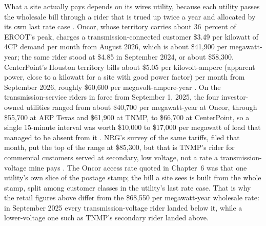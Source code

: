 What a site actually pays depends on its wires utility, because each utility passes the wholesale bill through a rider that is trued up twice a year and allocated by its own last rate case \autocite{puct25193}. %
Oncor, whose territory carries about 36~percent of ERCOT's peak, charges a transmission-connected customer \$3.49 per kilowatt of 4CP demand per month from August 2026, which is about \$41,900 per megawatt-year; the same rider stood at \$4.85 in September 2024, or about \$58,300. %
CenterPoint's Houston territory bills about \$5.05 per kilovolt-ampere (apparent power, close to a kilowatt for a site with good power factor) per month from September 2026, roughly \$60,600 per megavolt-ampere-year \autocite{centerpoint2026retailtariff}. %
On the transmission-service riders in force from September 1, 2025, the four investor-owned utilities ranged from about \$40,700 per megawatt-year at Oncor, through \$55,700 at AEP Texas and \$61,900 at TNMP, to \$66,700 at CenterPoint, so a single 15-minute interval was worth \$10,000 to \$17,000 per megawatt of load that managed to be absent from it \autocite{oncor2026retailtariff,aep2025tcrf58157,tnmp2025tcrf58161,centerpoint2025tcrf58178}. %
NRG's survey of the same tariffs, filed that month, put the top of the range at \$85,300, but that is TNMP's rider for commercial customers served at secondary, low voltage, not a rate a transmission-voltage mine pays \autocite{nrg2025comments58484}. %
The Oncor access rate quoted in Chapter~6 was that one utility's own slice of the postage stamp; the bill a site sees is built from the whole stamp, split among customer classes in the utility's last rate case. That is why the retail figures above differ from the \$68,550 per megawatt-year wholesale rate: in September 2025 every transmission-voltage rider landed below it, while a lower-voltage one such as TNMP's secondary rider landed above. %

